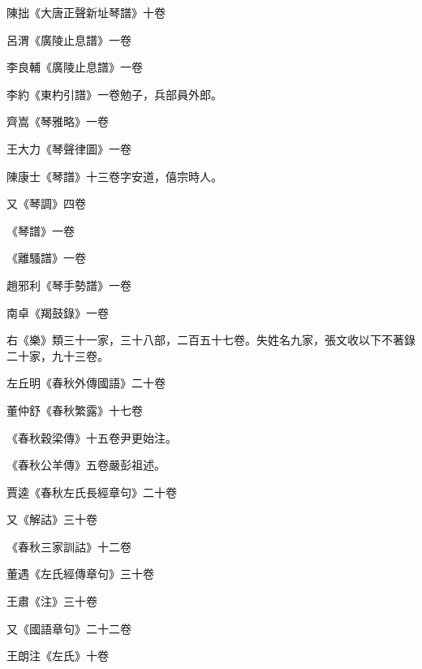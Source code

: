 \begin{pinyinscope}
 陳拙《大唐正聲新址琴譜》十卷



 呂渭《廣陵止息譜》一卷



 李良輔《廣陵止息譜》一卷



 李約《東杓引譜》一卷勉子，兵部員外郎。



 齊嵩《琴雅略》一卷



 王大力《琴聲律圖》一卷



 陳康士《琴譜》十三卷字安道，僖宗時人。



 又《琴調》四卷



 《琴譜》一卷



 《離騷譜》一卷



 趙邪利《琴手勢譜》一卷



 南卓《羯鼓錄》一卷



 右《樂》類三十一家，三十八部，二百五十七卷。失姓名九家，張文收以下不著錄二十家，九十三卷。



 左丘明《春秋外傳國語》二十卷



 董仲舒《春秋繁露》十七卷



 《春秋穀梁傳》十五卷尹更始注。



 《春秋公羊傳》五卷嚴彭祖述。



 賈逵《春秋左氏長經章句》二十卷



 又《解詁》三十卷



 《春秋三家訓詁》十二卷



 董遇《左氏經傳章句》三十卷



 王肅《注》三十卷



 又《國語章句》二十二卷



 王朗注《左氏》十卷




\end{pinyinscope}
